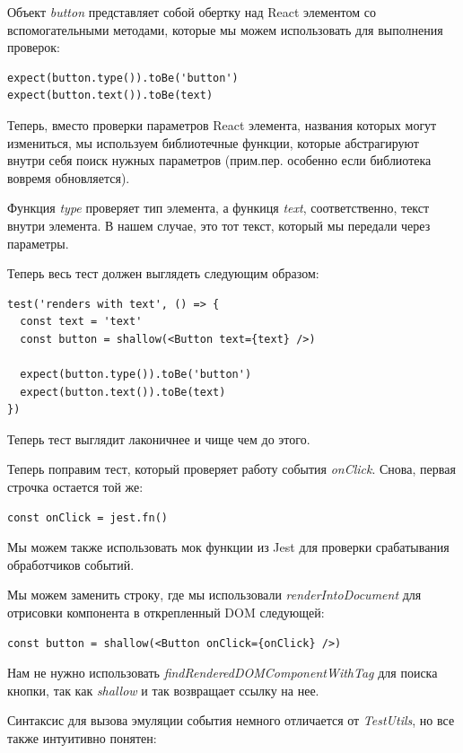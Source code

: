 Объект \textit{button} представляет собой обертку над React элементом со вспомогательными методами, которые мы можем использовать для выполнения проверок:

\begin{lstlisting}
expect(button.type()).toBe('button')
expect(button.text()).toBe(text)
\end{lstlisting}

Теперь, вместо проверки параметров React элемента, названия которых могут измениться, мы используем библиотечные функции, которые абстрагируют внутри себя поиск нужных параметров (прим.пер. особенно если библиотека вовремя обновляется).

Функция \textit{type} проверяет тип элемента, а функиця \textit{text}, соответственно, текст внутри элемента. В нашем случае, это тот текст, который мы передали через параметры.

Теперь весь тест должен выглядеть следующим образом:

\begin{lstlisting}
test('renders with text', () => {
  const text = 'text'
  const button = shallow(<Button text={text} />)
  
  expect(button.type()).toBe('button')
  expect(button.text()).toBe(text)
})
\end{lstlisting}

Теперь тест выглядит лаконичнее и чище чем до этого.

Теперь поправим тест, который проверяет работу события \textit{onClick}. Снова, первая строчка остается той же:

\begin{lstlisting}
const onClick = jest.fn()
\end{lstlisting}

Мы можем также использовать мок функции из Jest для проверки срабатывания обработчиков событий.

Мы можем заменить строку, где мы использовали \textit{renderIntoDocument} для отрисовки компонента в открепленный DOM следующей:

\begin{lstlisting}
const button = shallow(<Button onClick={onClick} />)
\end{lstlisting}

Нам не нужно использовать \textit{findRenderedDOMComponentWithTag} для поиска кнопки, так как \textit{shallow} и так возвращает ссылку на нее.

Синтаксис для вызова эмуляции события немного отличается от \textit{TestUtils}, но все также интуитивно понятен:

